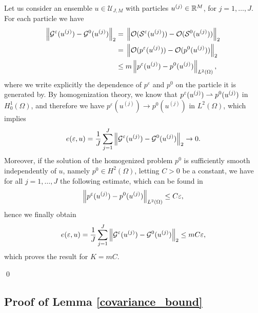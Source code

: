 Let us consider an ensemble $u \in \mathcal U_{J,M}$ with particles $u^{(j)} \in \mathbb{R}^M$, for $j = 1, \ldots, J$. For each particle we have
\begin{align}
\left\|\mathcal{G}^{\varepsilon}(u^{(j)}) - \mathcal{G}^0(u^{(j)})\right\|_2 = & \; \left\|\mathcal{O}(\mathcal{S}^{\varepsilon}(u^{(j)})) - \mathcal{O}(\mathcal{S}^0(u^{(j)}))\right\|_2 \\
= & \; \left\|\mathcal{O}(p^{\varepsilon}(u^{(j)})) - \mathcal{O}(p^0(u^{(j)}))\right\|_2 \\
\le & \; m \left\|p^{\varepsilon}(u^{(j)}) - p^0(u^{(j)})\right\|_{L^2(\Omega)},
\end{align}
where we write explicitly the dependence of $p^{\varepsilon}$ and $p^0$ on the particle it is generated by.
By homogenization theory, we know that $p^{\varepsilon}(u^{(j)}) \rightharpoonup p^0(u^{(j)})$ in $H^1_0(\Omega)$, and therefore we have $p^{\varepsilon}(u^{(j)}) \to p^0(u^{(j)})$ in $L^2(\Omega)$, which implies
\[ e(\varepsilon, u) = \frac{1}{J} \sum_{j=1}^J \left\|\mathcal{G}^{\varepsilon}(u^{(j)}) - \mathcal{G}^0(u^{(j)})\right\|_2 \to 0. \]
Moreover, if the solution of the homogenized problem $p^0$ is sufficiently smooth independently of $u$, namely $p^0 \in H^2(\Omega)$, letting $C > 0$ be a constant, we have for all $j = 1, \dots, J$ the following estimate, which can be found in \cite{Gri05}
\[ \left\|p^{\varepsilon}(u^{(j)}) - p^0(u^{(j)})\right\|_{L^2(\Omega)} \le C \varepsilon, \]
hence we finally obtain
\[ e(\varepsilon, u) = \frac{1}{J} \sum_{j=1}^J \left\|\mathcal{G}^{\varepsilon}(u^{(j)}) - \mathcal{G}^0(u^{(j)})\right\|_2 \le m C \varepsilon, \]
which proves the result for $K = m C$.

\qed

\subsection*{Proof of Lemma \ref{covariance_bound}}


